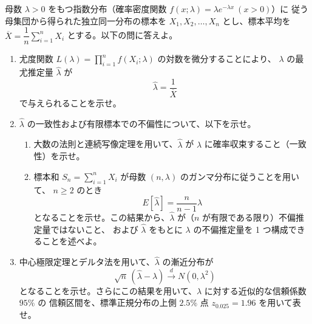 
母数 $\lambda > 0$ をもつ指数分布（確率密度関数 $f(x; \lambda) = \lambda e^{-\lambda x}\ (x > 0)$）に
従う母集団から得られた独立同一分布の標本を $X_1, X_2, \dots, X_n$ とし、標本平均を
$\overline{X} = \dfrac{1}{n}\displaystyle\sum_{i=1}^{n} X_i$ とする。以下の問に答えよ。

\begin{enumerate}
\item 尤度関数 $L(\lambda) = \displaystyle\prod_{i=1}^{n} f(X_i; \lambda)$ の対数を微分することにより、
$\lambda$ の最尤推定量 $\hat{\lambda}$ が
\[
\hat{\lambda} = \frac{1}{\overline{X}}
\]
で与えられることを示せ。

\item $\hat{\lambda}$ の一致性および有限標本での不偏性について、以下を示せ。
\begin{enumerate}
\item 大数の法則と連続写像定理を用いて、$\hat{\lambda}$ が $\lambda$ に確率収束すること（一致性）を示せ。
\item 標本和 $S_n = \displaystyle\sum_{i=1}^{n} X_i$ が母数 $(n, \lambda)$ のガンマ分布に従うことを用いて、
$n \ge 2$ のとき
\[
E[\hat{\lambda}] = \frac{n}{n-1}\lambda
\]
となることを示せ。この結果から、$\hat{\lambda}$ が（$n$ が有限である限り）不偏推定量ではないこと、
および $\hat{\lambda}$ をもとに $\lambda$ の不偏推定量を 1 つ構成できることを述べよ。
\end{enumerate}

\item 中心極限定理とデルタ法を用いて、$\hat{\lambda}$ の漸近分布が
\[
\sqrt{n}\,(\hat{\lambda} - \lambda) \xrightarrow{d} N(0, \lambda^{2})
\]
となることを示せ。さらにこの結果を用いて、$\lambda$ に対する近似的な信頼係数 $95\%$ の
信頼区間を、標準正規分布の上側 $2.5\%$ 点 $z_{0.025} = 1.96$ を用いて表せ。
\end{enumerate}
